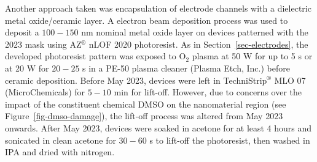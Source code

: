 \documentclass[
  letterpaper,
  DIV=11,
  numbers=noendperiod]{scrartcl}
\begin{document}
Another approach taken was encapsulation of electrode channels with a
dielectric metal oxide/ceramic layer. A electron beam deposition process
was used to deposit a \(100-150\) nm nominal metal oxide layer on
devices patterned with the 2023 mask using AZ\(^\circledR\) nLOF 2020
photoresist. As in Section~\ref{sec-electrodes}, the developed
photoresist pattern was exposed to O\(_2\) plasma at 50 W for up to 5 s
or at 20 W for \(20-25\) s in a PE-50 plasma cleaner (Plasma Etch, Inc.)
before ceramic deposition. Before May 2023, devices were left in
TechniStrip\(^\circledR\) MLO 07 (MicroChemicals) for \(5-10\) min for
lift-off. However, due to concerns over the impact of the constituent
chemical DMSO on the nanomaterial region (see
Figure~\ref{fig-dmso-damage}), the lift-off process was altered from May
2023 onwards. After May 2023, devices were soaked in acetone for at
least 4 hours and sonicated in clean acetone for \(30-60\) s to lift-off
the photoresist, then washed in IPA and dried with nitrogen.
\end{document}
